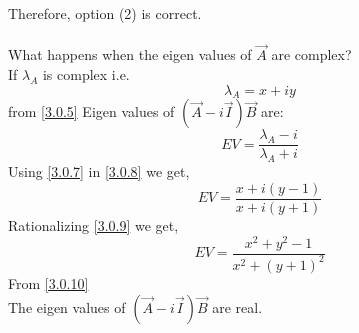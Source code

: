 \documentclass[journal,12pt,twocolumn]{IEEEtran}
\begin{document}
 Therefore, option (2) is correct.\\
 \\
 What happens when the eigen values of $\vec{A}$ are complex?\\
 If $\lambda_A$ is complex i.e.
 \begin{equation}\label{3.0.7}
 \lambda_A = x + iy
 \end{equation}
 from \eqref{3.0.5} Eigen values of $(\vec{A}-i\vec{I})\vec{B}$ are:\\
 \begin{equation}\label{3.0.8}
 EV = \frac{\lambda_A-i}{\lambda_A+i}
 \end{equation}
 Using \eqref{3.0.7} in \eqref{3.0.8} we get,
 \begin{equation}\label{3.0.9}
 EV = \frac{x+i(y-1)}{x+i(y+1)}
 \end{equation}
 Rationalizing \eqref{3.0.9} we get,
 \begin{equation}\label{3.0.10}
 EV = \frac{x^2+y^2-1}{x^2+(y+1)^2}
 \end{equation}
 From \eqref{3.0.10}\\
 The eigen values of $(\vec{A}-i\vec{I})\vec{B}$ are real.
\end{document}
